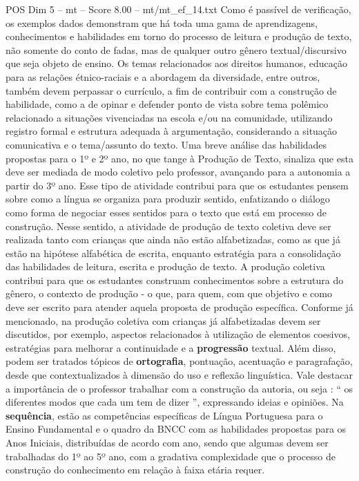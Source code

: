 \begin{textsample}{POS Dim 5 – mt – Score 8.00 – mt/mt\_ef\_14.txt}
Como é passível de verificação, os exemplos dados demonstram que há toda uma gama de aprendizagens, conhecimentos e habilidades em torno do processo de leitura e produção de texto, não somente do conto de fadas, mas de qualquer outro gênero textual/discursivo que seja objeto de ensino.
Os temas relacionados aos direitos humanos, educação para as relações étnico-raciais e a abordagem da diversidade, entre outros, também devem perpassar o currículo, a fim de contribuir com a construção de habilidade, como a de opinar e defender ponto de vista sobre tema polêmico relacionado a situações vivenciadas na escola e/ou na comunidade, utilizando registro formal e estrutura adequada à argumentação, considerando a situação comunicativa e o tema/assunto do texto.
Uma breve análise das habilidades propostas para o 1º e 2º ano, no que tange à Produção de Texto, sinaliza que esta deve ser mediada de modo coletivo pelo professor, avançando para a autonomia a partir do 3º ano.
Esse tipo de atividade contribui para que os estudantes pensem sobre como a língua se organiza para produzir sentido, enfatizando o diálogo como forma de negociar esses sentidos para o texto que está em processo de construção.
Nesse sentido, a atividade de produção de texto coletiva deve ser realizada tanto com crianças que ainda não estão alfabetizadas, como as que já estão na hipótese alfabética de escrita, enquanto estratégia para a consolidação das habilidades de leitura, escrita e produção de texto.
A produção coletiva contribui para que os estudantes construam conhecimentos sobre a estrutura do gênero, o contexto de produção - o que, para quem, com que objetivo e como deve ser escrito para atender aquela proposta de produção específica.
Conforme já mencionado, na produção coletiva com crianças já alfabetizadas devem ser discutidos, por exemplo, aspectos relacionados à utilização de elementos coesivos, estratégias para melhorar a continuidade e a \textbf{progressão} textual.
Além disso, podem ser tratados tópicos de \textbf{ortografia}, pontuação, acentuação e paragrafação, desde que contextualizados à dimensão do uso e reflexão linguística.
Vale destacar a importância de o professor trabalhar com a construção da autoria, ou seja : “ os diferentes modos que cada um tem de dizer ”, expressando ideias e opiniões.
Na \textbf{sequência}, estão as competências específicas de Língua Portuguesa para o Ensino Fundamental e o quadro da BNCC com as habilidades propostas para os Anos Iniciais, distribuídas de acordo com ano, sendo que algumas devem ser trabalhadas do 1º ao 5º ano, com a gradativa complexidade que o processo de construção do conhecimento em relação à faixa etária requer.

\end{textsample}
